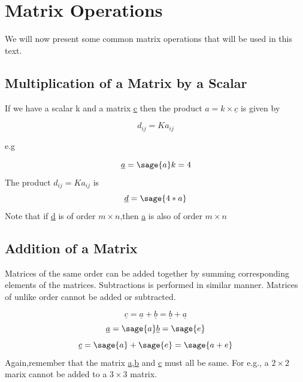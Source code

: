\documentclass[12pt]{report}
\begin{document}

\section{Matrix Operations}

We will now present some common matrix operations that will be used in this 
text.

\subsection{Multiplication of a Matrix by a Scalar}

If we have a scalar k and a matrix \underline{c}
then the product $a = k \times \underline{c} $ is given by

\begin{equation}d_{{ij}} = Ka_{{ij}}
	\label{eq:element}
\end{equation}

e.g

$$\underline{a}=\sage{a}
	k= 4 $$
The product 
$d_{{ij}} = Ka_{{ij}}$ is 
$$\underline{d} = \sage{4*a}$$
Note that if \underline{d} is of order
$ m \times n $,then \underline{a} is 
also of order $ m \times n $


\subsection{Addition of a Matrix}

Matrices of the same order can be added
together by summing corresponding elements
of the matrices. Subtractions is performed 
in similar manner. Matrices of unlike order
cannot be added or subtracted.

\begin{equation}
	\underline{c}=\underline{a}+
	\underline{b}= \underline{b}+\underline{a} 
\end{equation}
	$$\underline{a}=\sage{a}
	\underline{b}=\sage{e}$$
	$$\underline{c}=\sage{a} + \sage{e}=\sage{a+e}$$
Again,remember that the matrix 
\underline{a},\underline{b} and \underline{c} must 
all be same. For e.g., a $ 2 \times 2 $ 
marix cannot be added to a $ 3 \times 3 $ matrix.
\end{document}
